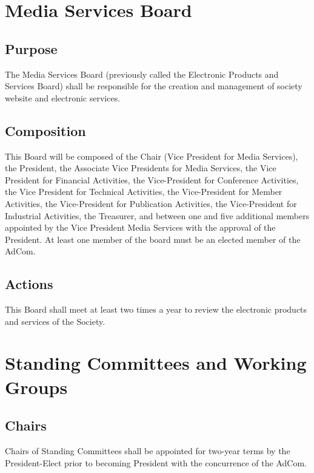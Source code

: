 \documentclass[10pt]{article}
\begin{document}
\section{Media Services Board}
\label{MSB}

\subsection{Purpose}

The Media Services Board (previously called the Electronic Products and Services Board) shall be responsible for the creation and management of society website and electronic services.

\subsection{Composition}

This Board will be composed of the Chair (Vice President for Media Services), the President, the Associate Vice Presidents for Media Services, the Vice President for Financial Activities, the Vice-President for Conference Activities,  the Vice President for Technical Activities, the Vice-President for Member Activities, the Vice-President for Publication Activities, the Vice-President for Industrial Activities, the Treasurer, and between one and five additional members appointed by the Vice President Media Services with the approval of the President. At least one member of the board must be an elected member of the AdCom.  

\subsection{Actions}

This Board shall meet at least two times a year to review the electronic products and services of the Society.


\section{Standing Committees and Working Groups}
\label{StandingCommittees}

\subsection{Chairs}

Chairs of Standing Committees shall be appointed for two-year terms by the President-Elect prior to becoming President with the concurrence of the AdCom.
\end{document}
